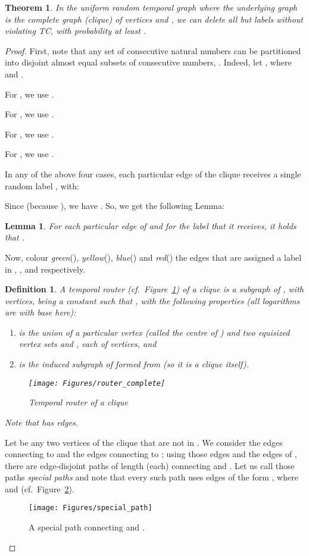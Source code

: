 \documentclass[a4paper,UKenglish]{article}
\newtheorem{theorem}{Theorem}
\newtheorem{definition}{Definition}
\newtheorem{lemma}{Lemma}
\begin{document}
\begin{theorem}\label{thm:random_complete}
In the uniform random temporal graph where the underlying graph  is the complete graph (clique) of  vertices and , we can delete all but  labels without violating TC, with probability at least .
\end{theorem}
\begin{proof}
First, note that any set  of  consecutive natural numbers can be partitioned into  disjoint almost equal subsets of consecutive numbers, . Indeed, let , where  and .

For , we use .

For , we use .

For , we use .

For , we use .

In any of the above four cases, each particular edge of the clique  receives a single random label , with:

Since  (because ), we have . So, we get the following Lemma:
\begin{lemma}\label{lem:clique_set_partition}
For each particular edge  of  and for the label  that it receives, it holds that .
\end{lemma}
Now, colour \emph{green}(), \emph{yellow}(), \emph{blue}() and \emph{red}() the edges that are assigned a label in , ,  and  respectively.

\begin{definition}
A temporal router (cf.~Figure~\ref{fig:router_complete}) of a clique  is a subgraph  of , with  vertices,  being a constant such that , with the following properties (all logarithms are with base  here):
\begin{enumerate}[label=\alph*)]
\item  is the union of a particular vertex  (called the \emph{centre} of ) and two equisized vertex sets  and , each of  vertices, and
\item  is the induced subgraph of  formed from  (so it is a clique itself).
\end{enumerate}
\begin{figure}[!htb]
\centering
\texttt{[image: Figures/router\_complete]}
\caption{Temporal router of a clique}
\label{fig:router_complete}
\end{figure}
Note that  has  edges.
\end{definition}

Let  be any two vertices of the clique that are not in . We consider the edges connecting  to  and the edges connecting  to ; using those edges and the edges of , there are  edge-disjoint paths of length  (each) connecting  and . Let us call those paths \emph{special paths} and note that every such path uses edges of the form , where  and  (cf.~Figure~\ref{fig:special_path}).
\begin{figure}[!htb]
\centering
\texttt{[image: Figures/special\_path]}
\caption{A special path connecting  and .}
\label{fig:special_path}
\end{figure}


\end{proof}
\end{document}

